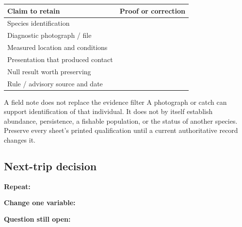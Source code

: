 {\begin{tabularx}{\linewidth}{@{}p{.29\linewidth}L@{}}
\toprule
Claim to retain & Proof or correction\\
\midrule
Species identification & \rule{0pt}{4.2em}\dotfill\\
Diagnostic photograph / file & \rule{0pt}{4.2em}\dotfill\\
Measured location and conditions & \rule{0pt}{4.2em}\dotfill\\
Presentation that produced contact & \rule{0pt}{4.2em}\dotfill\\
Null result worth preserving & \rule{0pt}{4.2em}\dotfill\\
Rule / advisory source and date & \rule{0pt}{4.2em}\dotfill\\
\bottomrule
\end{tabularx}

\begin{teloshazard}{A field note does not replace the evidence filter}
A photograph or catch can support identification of that individual. It does
not by itself establish abundance, persistence, a fishable population, or the
status of another species. Preserve every sheet's printed qualification until
a current authoritative record changes it.
\end{teloshazard}

\subsection*{Next-trip decision}
\noindent\textbf{Repeat:}\ \dotfill\par\vspace{1.2em}
\noindent\textbf{Change one variable:}\ \dotfill\par\vspace{1.2em}
\noindent\textbf{Question still open:}\ \dotfill
\clearpage}

